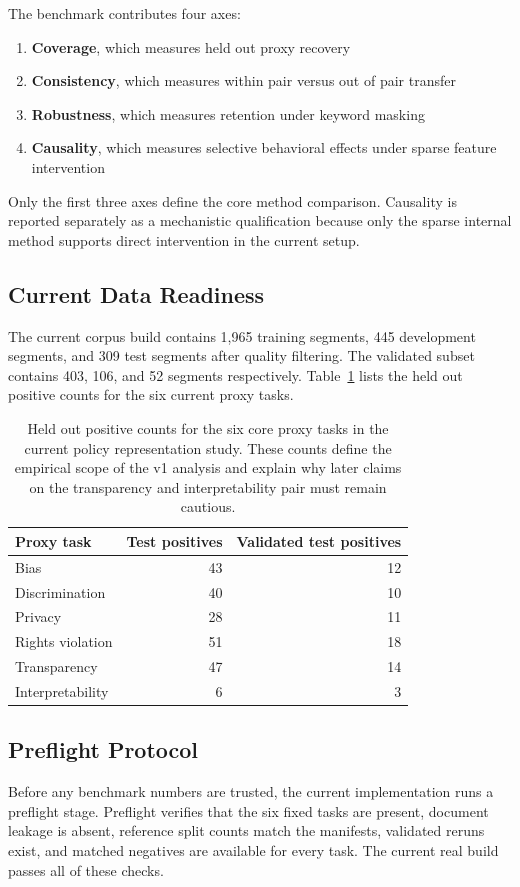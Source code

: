 ﻿\documentclass{article}
\begin{document}
The benchmark contributes four axes:
\begin{enumerate}
    \item \textbf{Coverage}, which measures held out proxy recovery
    \item \textbf{Consistency}, which measures within pair versus out of pair transfer
    \item \textbf{Robustness}, which measures retention under keyword masking
    \item \textbf{Causality}, which measures selective behavioral effects under sparse feature intervention
\end{enumerate}

Only the first three axes define the core method comparison. Causality is reported separately as a mechanistic qualification because only the sparse internal method supports direct intervention in the current setup.

\subsection{Current Data Readiness}
The current corpus build contains 1,965 training segments, 445 development segments, and 309 test segments after quality filtering. The validated subset contains 403, 106, and 52 segments respectively. Table~\ref{tab:taskcounts} lists the held out positive counts for the six current proxy tasks.

\begin{table}[t]
\centering
\small
\begin{tabular}{lrr}
\toprule
Proxy task & Test positives & Validated test positives \\
\midrule
Bias & 43 & 12 \\
Discrimination & 40 & 10 \\
Privacy & 28 & 11 \\
Rights violation & 51 & 18 \\
Transparency & 47 & 14 \\
Interpretability & 6 & 3 \\
\bottomrule
\end{tabular}
\caption{Held out positive counts for the six core proxy tasks in the current policy representation study. These counts define the empirical scope of the v1 analysis and explain why later claims on the transparency and interpretability pair must remain cautious.}
\label{tab:taskcounts}
\end{table}

\subsection{Preflight Protocol}
Before any benchmark numbers are trusted, the current implementation runs a preflight stage. Preflight verifies that the six fixed tasks are present, document leakage is absent, reference split counts match the manifests, validated reruns exist, and matched negatives are available for every task. The current real build passes all of these checks.
\end{document}
